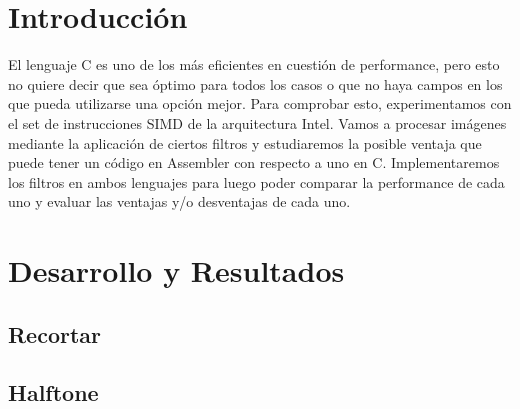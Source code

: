 \documentclass[a4paper,10pt,twoside]{article}
\begin{document}
\newpage




\tableofcontents

\newpage




\section{Introducción}

El lenguaje C es uno de los más eficientes en cuestión de performance, pero esto no quiere decir que sea óptimo para todos los casos o que no haya campos en los que pueda utilizarse una opción mejor.
Para comprobar esto, experimentamos con el set de instrucciones SIMD de la arquitectura Intel. Vamos a procesar imágenes mediante la aplicación de ciertos filtros y estudiaremos la posible ventaja que puede tener un código en Assembler con respecto a uno en C.
Implementaremos los filtros en ambos lenguajes para luego poder comparar la performance de cada uno y evaluar las ventajas y/o desventajas de cada uno.





\section{Desarrollo y Resultados}

\subsection{Recortar}



\subsection{Halftone}
\end{document}
